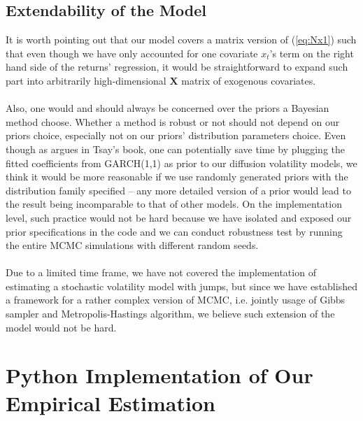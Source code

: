 \documentclass[letterpaper]{article}
\begin{document}
\subsection{Extendability of the Model}
It is worth pointing out that our model covers a matrix version of (\ref{eq:Nx1}) such that even though we have only accounted for one covariate $x_t$'s term on the right hand side of the returns' regression, it would be straightforward to expand such part into arbitrarily high-dimensional $\mathbf{X}$ matrix of exogenous covariates.\\\\
Also, one would and should always be concerned over the priors a Bayesian method choose. Whether a method is robust or not should not depend on our priors choice, especially not on our priors' distribution parameters choice. Even though as argues in Tsay's book, one can potentially save time by plugging the fitted coefficients from GARCH(1,1) as prior to our diffusion volatility models, we think it would be more reasonable if we use randomly generated priors with the distribution family specified --  any more detailed version of a prior would lead to the result being incomparable to that of other models. On the implementation level, such practice would not be hard because we have isolated and exposed our prior specifications in the code and we can conduct robustness test by running the entire MCMC simulations with different random seeds.\\\\
Due to a limited time frame, we have not covered the implementation of estimating a stochastic volatility model with jumps, but since we have established a framework for a rather complex version of MCMC, i.e. jointly usage of Gibbs sampler and Metropolis-Hastings algorithm, we believe such extension of the model would not be hard.
\newpage
\appendix
\section{Python Implementation of Our Empirical Estimation}
\newcommand{\PythonStyle}{
\lstset{
    language=Python,
    basicstyle=\ttfamily\small,
    keywordstyle=\color{jpurple}\bfseries,
    stringstyle=\color{red},
    commentstyle=\color{verde},
    morecomment=[s][\color{blue}]{/**}{*/},
    extendedchars=true,
    showspaces=false,
    showstringspaces=false,
    numbers=left,
    numberstyle=\tiny,
    breaklines=true,
    backgroundcolor=\color{cyan!10},
    breakautoindent=true,
    captionpos=b,
    xleftmargin=0pt,
    tabsize=2
}}
\end{document}
